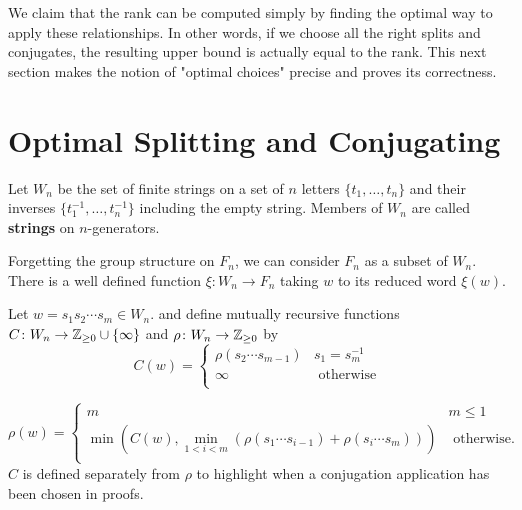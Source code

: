 \documentclass[12pt]{thesis}
\begin{document}
We claim that the rank can be computed simply by finding
the optimal way to apply these relationships.
In other words, if we choose all the right splits and conjugates, the resulting
upper bound is actually equal to the rank.
This next section makes the notion of "optimal choices" precise and proves
 its correctness.

\section{Optimal Splitting and Conjugating}

\begin{definition}
    Let $W_{n}$ be the set of finite strings on a set of $n$ letters $\{ t_{1}, \ldots, t_{n} \}$ 
    and their inverses $\{ t_{1}^{-1}, \ldots, t_{n}^{-1} \}$
    including the empty string.
    Members of $W_{n}$ are called \textbf{strings} on $n$-generators.
\end{definition}

Forgetting the group structure on $F_{n}$,
we can consider $F_{n}$ as a subset of $W_{n}$.
There is a well defined function $\xi \colon W_{n} \rightarrow F_{n}$
taking $w$ to its reduced word $\xi(w)$.

Let $w = s_{1}s_{2} \cdots s_{m} \in W_{n}$.
and define mutually recursive functions $C \colon W_{n} \rightarrow \mathbb{Z}_{\geq 0} \cup \{ \infty \}$
and $\rho \colon W_{n} \rightarrow \mathbb{Z}_{\geq 0}$ by
\begin{equation}
    \label{conjugation-rule}
    C(w) =  \begin{cases}
        \rho(s_{2} \cdots s_{m - 1}) & s_{1} = s_{m}^{-1} \\
        \infty & \text{ otherwise } \\
    \end{cases}
\end{equation}

\begin{equation}
    \label{rank-rule}
\rho(w) =
\begin{cases}
    m & m \leq 1 \\
    \min(C(w), \min_{1< i < m} ( \rho(s_{1} \cdots s_{i - 1}) + \rho(s_{i} \cdots s_{m}) ) ) &  \text{ otherwise. } \\
\end{cases}
\end{equation}
$C$ is defined separately from $\rho$ to highlight when a conjugation
application has been chosen in proofs.
\end{document}
